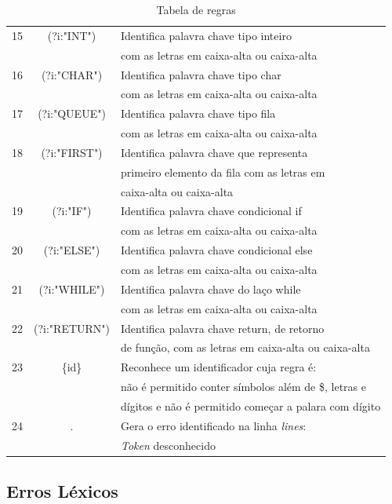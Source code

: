\documentclass[12pt]{article}
\begin{document}
\begin{table}
\begin{tabular}{|c || c  l |}
 \hline
 15 & (?i:"INT")& Identifica palavra chave tipo inteiro \\&& com as letras em caixa-alta ou caixa-alta \\
 \hline
 16 & (?i:"CHAR") & Identifica palavra chave tipo char \\&& com as letras em caixa-alta ou caixa-alta \\
 \hline
 17 & (?i:"QUEUE")& Identifica palavra chave tipo fila \\&& com as letras em caixa-alta ou caixa-alta \\
 \hline
 18 & (?i:"FIRST")& Identifica palavra chave que representa \\&&  primeiro elemento da fila com as letras em \\&& caixa-alta ou caixa-alta  \\
 \hline
 19 & (?i:"IF")& Identifica palavra chave condicional if \\&& com as letras em caixa-alta ou caixa-alta \\
 \hline
 20 & (?i:"ELSE")& Identifica palavra chave condicional else \\&& com as letras em caixa-alta ou caixa-alta \\
 \hline
 21 & (?i:"WHILE")& Identifica palavra chave do laço while \\&& com as letras em caixa-alta ou caixa-alta \\
 \hline
 22 & (?i:"RETURN")& Identifica palavra chave return, de retorno \\&& de função, com as letras em caixa-alta ou caixa-alta \\
 \hline
 23 & \{id\} & Reconhece um identificador cuja regra é: \\&& não é permitido conter símbolos além de \$, letras e \\&& dígitos e não é permitido começar a palara com dígito \\
 \hline
 24 & . & {\color{red}Gera o erro identificado na linha \textit{lines}:} \\&& {\color{red}\textit{Token} desconhecido} \\
 \hline
\end{tabular}
\caption{Tabela de regras}
\label{TabelaRegras}
\end{table}

\subsection{Erros Léxicos}
\end{document}
